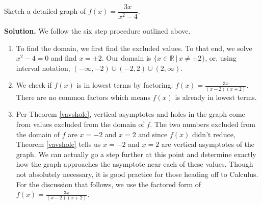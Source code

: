 \begin{ex}  Sketch a detailed graph of $f(x) = \dfrac{3x}{x^2-4}$.

{\bf Solution.}  We follow the six step procedure outlined above.

\begin{enumerate}

\item  To find the domain, we first find the excluded values.  To that end, we solve  $x^2 - 4 = 0$ and find $x = \pm 2$. Our domain is $\{ x \in \mathbb{R} \, | \,  x \neq \pm 2\}$, or, using interval notation,  $(-\infty, -2) \cup (-2,2) \cup (2,\infty)$.

\item  We check if  $f(x)$ is in lowest terms by factoring: $f(x) = \frac{3x}{(x-2)(x+2)}$.  There are no common factors which means $f(x)$ is already in lowest terms.

\item  Per Theorem \ref{vavshole}, vertical asymptotes and holes in the graph come from values excluded from the domain of $f$.  The two numbers excluded from the domain of $f$ are $x = -2$ and $x=2$ and since  $f(x)$ didn't reduce,  Theorem \ref{vavshole} tells us $x=-2$ and $x=2$ are vertical asymptotes of the graph.  We can actually go a step further at this point and determine exactly how the graph approaches the asymptote near each of these values. Though not absolutely necessary, it is good practice for those heading off to Calculus.  For the discussion that follows,  we use the factored form of $f(x) = \frac{3x}{(x-2)(x+2)}$.

\begin{itemize}


\end{itemize}
\end{enumerate}
\end{ex}
